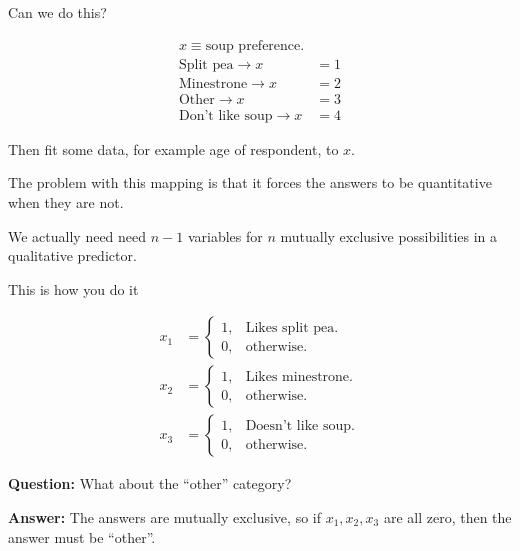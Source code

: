 \documentclass[aspectratio=169]{beamer}
\begin{document}
\begin{frame}{Can we do this?}



\vspace{5mm}

\begin{align*}
x \equiv \text{soup preference.}&\\
\text{Split pea} \rightarrow x &= 1\\
\text{Minestrone}  \rightarrow x &= 2\\
\text{Other}  \rightarrow x &= 3\\
\text{Don't like soup}  \rightarrow x &= 4
\end{align*}

\vspace{5mm}

Then fit some data, for example age of respondent, to $x$.
\pause

\vspace{5mm}

The problem with this mapping is that it forces the answers to be quantitative when they are not.

\vspace{3mm}\pause

We actually need need $n-1$ variables for $n$ mutually exclusive possibilities in a qualitative predictor.

\end{frame}

\begin{frame}{This is how you do it}

\begin{align*}
x_1 &=\begin{cases}
    1, & \text{Likes split pea}.\\
    0, & \text{otherwise}.
  \end{cases}\\
x_2 &=\begin{cases}
    1, & \text{Likes minestrone}.\\
    0, & \text{otherwise}.
  \end{cases} \\
x_3 &=\begin{cases}
    1, & \text{Doesn't like soup}.\\
    0, & \text{otherwise}.
  \end{cases}  
\end{align*}
 
  \textbf{Question:} What about the ``other'' category?  
  
  \pause
  
  \textbf{Answer: } The answers are mutually exclusive, so if $x_1, x_2, x_3$ are all zero, then the answer must be ``other''.

\end{frame}
\end{document}

